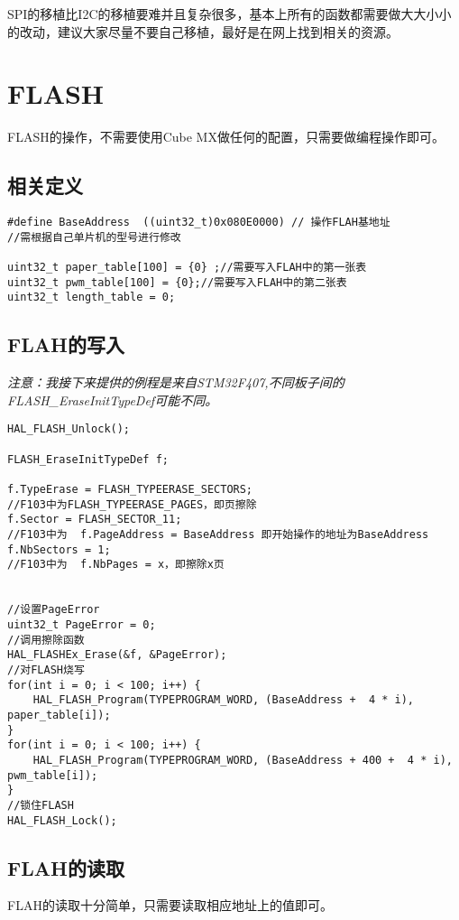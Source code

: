 \documentclass[cn,11pt]{elegantbook}
\begin{document}
SPI的移植比I2C的移植要难并且复杂很多，基本上所有的函数都需要做大大小小的改动，建议大家尽量不要自己移植，最好是在网上找到相关的资源。


\section{FLASH}

FLASH的操作，不需要使用Cube MX做任何的配置，只需要做编程操作即可。

\subsection{相关定义}
\lstset{language=C}
\begin{lstlisting}
#define BaseAddress  ((uint32_t)0x080E0000) // 操作FLAH基地址
//需根据自己单片机的型号进行修改

uint32_t paper_table[100] = {0} ;//需要写入FLAH中的第一张表
uint32_t pwm_table[100] = {0};//需要写入FLAH中的第二张表
uint32_t length_table = 0;
\end{lstlisting}

\subsection{FLAH的写入}

\emph{注意：我接下来提供的例程是来自STM32F407,不同板子间的FLASH\_EraseInitTypeDef可能不同。}

\lstset{language=C}
\begin{lstlisting}
HAL_FLASH_Unlock();

FLASH_EraseInitTypeDef f;

f.TypeErase = FLASH_TYPEERASE_SECTORS; 
//F103中为FLASH_TYPEERASE_PAGES，即页擦除
f.Sector = FLASH_SECTOR_11;
//F103中为  f.PageAddress = BaseAddress 即开始操作的地址为BaseAddress
f.NbSectors = 1;
//F103中为  f.NbPages = x，即擦除x页


//设置PageError
uint32_t PageError = 0;
//调用擦除函数
HAL_FLASHEx_Erase(&f, &PageError);
//对FLASH烧写
for(int i = 0; i < 100; i++) {
	HAL_FLASH_Program(TYPEPROGRAM_WORD, (BaseAddress +  4 * i),  paper_table[i]);
}
for(int i = 0; i < 100; i++) {
	HAL_FLASH_Program(TYPEPROGRAM_WORD, (BaseAddress + 400 +  4 * i),  pwm_table[i]);
}
//锁住FLASH
HAL_FLASH_Lock();
\end{lstlisting}

\subsection{FLAH的读取}
FLAH的读取十分简单，只需要读取相应地址上的值即可。
\end{document}
